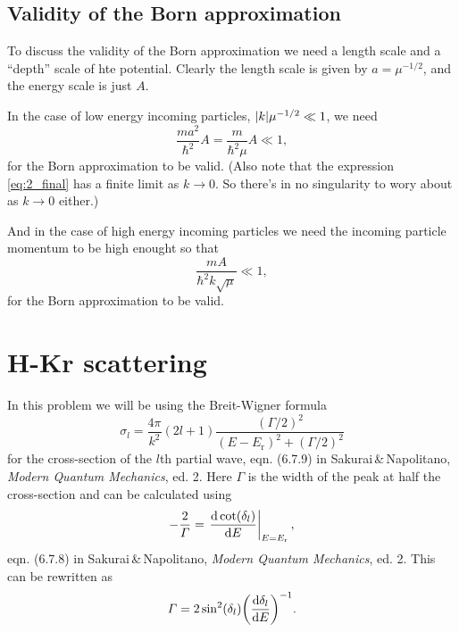\documentclass[11pt,letter, swedish, english
]{article}
\begin{document}
\subsection*{Validity of the Born approximation}
To discuss the validity of the Born approximation we need a length
scale and a ``depth'' scale of hte potential. Clearly the length scale
is given by $a=\mu^{-1/2}$, and the energy scale is just $A$.

In the case of low energy incoming particles, $\abs{k}\mu^{-1/2}\ll1$,
we need  
\begin{equation}
\frac{ma^2}{\hbar^2}A=\frac{m}{\hbar^2\mu}A\ll1,
\end{equation}
for the Born approximation to be valid. (Also note that the expression
\eqref{eq:2_final} has a finite limit as $k\to0$. So there's in no
singularity to wory about as $k\to0$ either.)

And in the case of high energy incoming particles we need the incoming
particle momentum to be high enought so that
\begin{equation}
\frac{mA}{\hbar^2k\sqrt{\mu}}\ll1,
\end{equation}
for the Born approximation to be valid.








\section{H-Kr scattering}
\newcommand{\Er}{E_{\text{r}}}
\newcommand{\BW}{\text{(BW)}}

In this problem we will be using the Breit-Wigner formula
\begin{equation}\label{eq:3_BW}
\sigma_l=
\frac{4\pi}{k^2} (2l+1) \frac{(\varGamma/2)^2}{(E-\Er)^2+(\varGamma/2)^2}
\end{equation}
for the cross-section of the $l$th partial wave, eqn. (6.7.9) in
Sakurai\,\&\,Napolitano, \textit{Modern Quantum Mechanics},
ed. 2. Here $\varGamma$ is the width of the peak at half the
cross-section and can be calculated using
\begin{equation}
-\frac{2}{\varGamma} = \eval{\dv{\cot(\delta_l)}{E}}_{E=\Er},
\end{equation}
eqn. (6.7.8)  in Sakurai\,\&\,Napolitano, 
\textit{Modern Quantum Mechanics}, ed. 2. This can be rewritten as
\begin{equation}\label{eq:3_Gamma}
\varGamma=2\sin^2(\delta_l) \qty(\dv{\delta_l}{E})^{-1}.
\end{equation}
\end{document}
